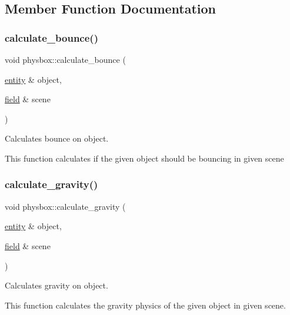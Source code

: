 \subsection{Member Function Documentation}
\mbox{\label{classphysbox_a1e1ca37a18b94e3fab074120e65f7e03}} 
\subsubsection{\texorpdfstring{calculate\+\_\+bounce()}{calculate\_bounce()}}
{\footnotesize\ttfamily void physbox\+::calculate\+\_\+bounce (\begin{DoxyParamCaption}\item[{\hyperlink{classentity}{entity} \&}]{object,  }\item[{\hyperlink{classfield}{field} \&}]{scene }\end{DoxyParamCaption})}



Calculates bounce on object. 

This function calculates if the given object should be bouncing in given scene \mbox{\label{classphysbox_aacb7573b68494f352edb2697c5124571}} 
\subsubsection{\texorpdfstring{calculate\+\_\+gravity()}{calculate\_gravity()}}
{\footnotesize\ttfamily void physbox\+::calculate\+\_\+gravity (\begin{DoxyParamCaption}\item[{\hyperlink{classentity}{entity} \&}]{object,  }\item[{\hyperlink{classfield}{field} \&}]{scene }\end{DoxyParamCaption})}



Calculates gravity on object. 

This function calculates the gravity physics of the given object in given scene. \mbox{\label{classphysbox_ab6ae32c018841713b135a1fc511b9518}} 
